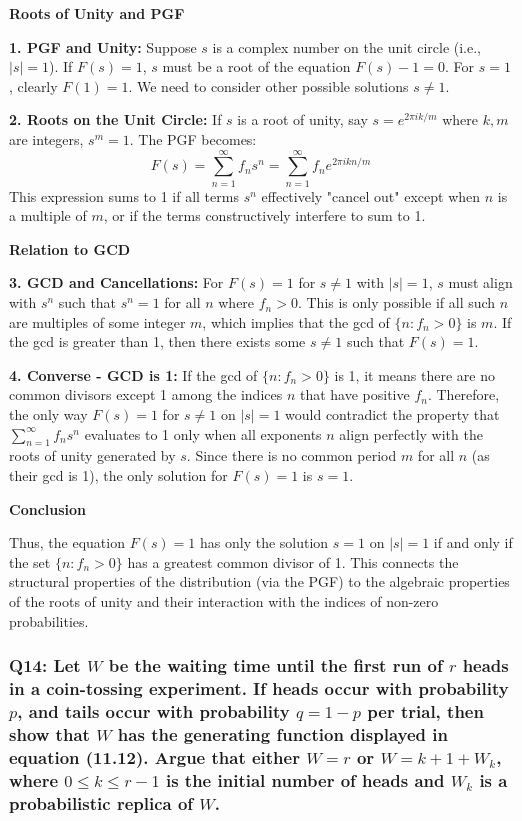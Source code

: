 \documentclass[8pt]{article}
\begin{document}
{\textbf{Roots of Unity and PGF}

\textbf{1. PGF and Unity:} Suppose \( s \) is a complex number on the unit circle (i.e., \( |s| = 1 \)). If \( F(s) = 1 \), \( s \) must be a root of the equation \( F(s) - 1 = 0 \). For \( s = 1 \), clearly \( F(1) = 1 \). We need to consider other possible solutions \( s \neq 1 \).

\textbf{2. Roots on the Unit Circle:} If \( s \) is a root of unity, say \( s = e^{2\pi i k/m} \) where \( k, m \) are integers, \( s^m = 1 \). The PGF becomes:
   \[
   F(s) = \sum_{n=1}^\infty f_n s^n = \sum_{n=1}^\infty f_n e^{2\pi i kn/m}
   \]
   This expression sums to 1 if all terms \( s^n \) effectively "cancel out" except when \( n \) is a multiple of \( m \), or if the terms constructively interfere to sum to 1.

\textbf{Relation to GCD}

\textbf{3. GCD and Cancellations:} For \( F(s) = 1 \) for \( s \neq 1 \) with \( |s| = 1 \), \( s \) must align with \( s^n \) such that \( s^n = 1 \) for all \( n \) where \( f_n > 0 \). This is only possible if all such \( n \) are multiples of some integer \( m \), which implies that the gcd of \( \{ n : f_n > 0 \} \) is \( m \). If the gcd is greater than 1, then there exists some \( s \neq 1 \) such that \( F(s) = 1 \).

\textbf{4. Converse - GCD is 1:} If the gcd of \( \{ n : f_n > 0 \} \) is 1, it means there are no common divisors except 1 among the indices \( n \) that have positive \( f_n \). Therefore, the only way \( F(s) = 1 \) for \( s \neq 1 \) on \( |s| = 1 \) would contradict the property that \( \sum_{n=1}^\infty f_n s^n \) evaluates to 1 only when all exponents \( n \) align perfectly with the roots of unity generated by \( s \). Since there is no common period \( m \) for all \( n \) (as their gcd is 1), the only solution for \( F(s) = 1 \) is \( s = 1 \).

\textbf{Conclusion}

Thus, the equation \( F(s) = 1 \) has only the solution \( s = 1 \) on \( |s| = 1 \) if and only if the set \( \{ n : f_n > 0 \} \) has a greatest common divisor of 1. This connects the structural properties of the distribution (via the PGF) to the algebraic properties of the roots of unity and their interaction with the indices of non-zero probabilities.

\subsubsection*{Q14:
Let \(W\) be the waiting time until the first run of \(r\) heads in a coin-tossing experiment. If heads occur with probability \(p\), and tails occur with probability \(q = 1 - p\) per trial, then show that \(W\) has the generating function displayed in equation (11.12). Argue that either \(W = r\) or \(W = k + 1 + W_k\), where \(0 \leq k \leq r - 1\) is the initial number of heads and \(W_k\) is a probabilistic replica of \(W\).}

}
\end{document}
